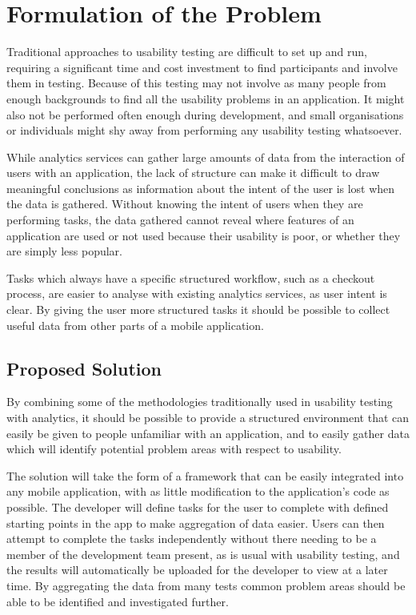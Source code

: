 \chapter{Formulation of the Problem}

Traditional approaches to usability testing are difficult to set up and run, requiring a significant time and cost investment to find participants and involve them in testing. Because of this testing may not involve as many people from enough backgrounds to find all the usability problems in an application. It might also not be performed often enough during development, and small organisations or individuals might shy away from performing any usability testing whatsoever.

While analytics services can gather large amounts of data from the interaction of users with an application, the lack of structure can make it difficult to draw meaningful conclusions as information about the intent of the user is lost when the data is gathered. Without knowing the intent of users when they are performing tasks, the data gathered cannot reveal where features of an application are used or not used because their usability is poor, or whether they are simply less popular.  

Tasks which always have a specific structured workflow, such as a checkout process, are easier to analyse with existing analytics services, as user intent is clear. By giving the user more structured tasks it should be possible to collect useful data from other parts of a mobile application.


\section{Proposed Solution}

By combining some of the methodologies traditionally used in usability testing with analytics, it should be possible to provide a structured environment that can easily be given to people unfamiliar with an application, and to easily gather data which will identify potential problem areas with respect to usability.

The solution will take the form of a framework that can be easily integrated into any mobile application, with as little modification to the application's code as possible. The developer will define tasks for the user to complete with defined starting points in the app to make aggregation of data easier. Users can then attempt to complete the tasks independently without there needing to be a member of the development team present, as is usual with usability testing, and the results will automatically be uploaded for the developer to view at a later time. By aggregating the data from many tests common problem areas should be able to be identified and investigated further.